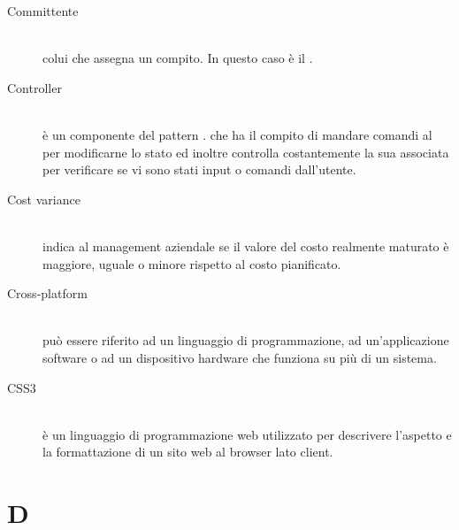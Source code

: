 \documentclass[12pt,a4paper]{article}
\begin{document}
\begin{description}
\item[Committente] 
\hfill\\ colui che assegna un compito. In questo caso è il \Vardanega{}.

\item[Controller] 
\hfill\\ è un componente del pattern . che ha il compito di mandare comandi al  per modificarne lo stato ed inoltre controlla costantemente la sua  associata per verificare se vi sono stati input o comandi dall'utente.

\item[Cost variance] 
\hfill\\ indica al management aziendale se il valore del costo realmente maturato è maggiore, uguale o minore rispetto al costo pianificato.

\item[Cross-platform] 
\hfill\\ può essere riferito ad un linguaggio di programmazione, ad un'applicazione software o ad un dispositivo hardware che funziona su più di un sistema.

\item[CSS3] 
\hfill\\ è un linguaggio di programmazione web utilizzato per descrivere l'aspetto e la formattazione di un sito web al browser lato client.
\end{description}

\newpage

\section{D}
\end{document}
